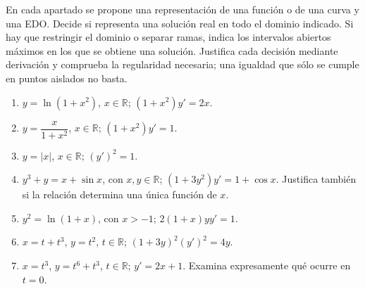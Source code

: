 En cada apartado se propone una representación de una función o de una curva y una EDO. Decide si representa una solución real en todo el dominio indicado. Si hay que restringir el dominio o separar ramas, indica los intervalos abiertos máximos en los que se obtiene una solución. Justifica cada decisión mediante derivación y comprueba la regularidad necesaria; una igualdad que sólo se cumple en puntos aislados no basta.
\begin{enumerate}
\item $y=\ln(1+x^2)$, $x\in\mathbb{R}$; \quad $(1+x^2)y'=2x$.
\item $y=\dfrac{x}{1+x^2}$, $x\in\mathbb{R}$; \quad $(1+x^2)y'=1$.
\item $y=|x|$, $x\in\mathbb{R}$; \quad $(y')^2=1$.
\item $y^3+y=x+\sin x$, con $x,y\in\mathbb{R}$; \quad $(1+3y^2)y'=1+\cos x$. Justifica también si la relación determina una única función de $x$.
\item $y^2=\ln(1+x)$, con $x>-1$; \quad $2(1+x)yy'=1$.
\item $x=t+t^3$, $y=t^2$, $t\in\mathbb{R}$; \quad $(1+3y)^2(y')^2=4y$.
\item $x=t^3$, $y=t^6+t^3$, $t\in\mathbb{R}$; \quad $y'=2x+1$. Examina expresamente qué ocurre en $t=0$.
\end{enumerate}
